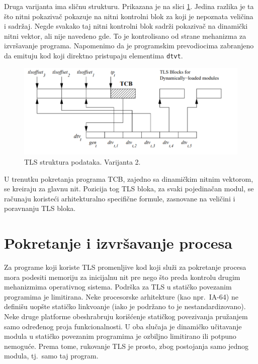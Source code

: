 \documentclass[12pt,oneside]{memoir}
\begin{document}
Druga varijanta ima sličnu strukturu. Prikazana je na slici \ref{fig:tls_model2}. Jedina razlika je ta što nitni pokazivač pokazuje na nitni kontrolni blok za koji je nepoznata veličina i sadržaj. Negde svakako taj nitni kontrolni blok sadrži pokazivač na dinamički nitni vektor, ali nije navedeno gde. To je kontrolisano od strane mehanizma za izvršavanje programa. Napomenimo da je programskim prevodiocima zabranjeno da emituju kod koji direktno pristupaju elementima \texttt{dtvt}.

\begin{figure}[h!]
	\begin{center}
		\includegraphics[scale=0.6]{slike/TLSmodelV2.png}
	\end{center}
	\caption{TLS struktura podataka. Varijanta 2.}
	\label{fig:tls_model2}
\end{figure}

U trenutku pokretanja programa TCB, zajedno sa dinamičkim nitnim vektorom, se kreiraju za glavnu nit. Pozicija tog TLS bloka, za svaki pojedinačan modul, se računaju koristeći arhitekturalno specifične formule, zasnovane na veličini i poravnanju TLS bloka.

\section{Pokretanje i izvršavanje procesa}

Za programe koji koriste TLS promenljive kod koji služi za pokretanje procesa mora podesiti memoriju za inicijalnu nit pre nego što preda kontrolu drugim mehanizmima operativnog sistema. Podrška za TLS u statičko povezanim programima je limitirana. Neke procesorske arhitekture (kao npr.~IA-64) ne definišu uopšte statičko linkvoanje (iako je podržano to je nestandardizovano). Neke druge platforme obeshrabruju korišćenje statičkog povezivanja pružanjem samo određenog proja funkcionalnosti. U oba slučaja je dinamičko učitavanje modula u statičko povezanim programima je ozbiljno limitirano ili potpuno nemoguće. Prema tome, rukovanje TLS je prosto, zbog postojanja samo jednog modula, tj.~samo taj program.
\end{document}
